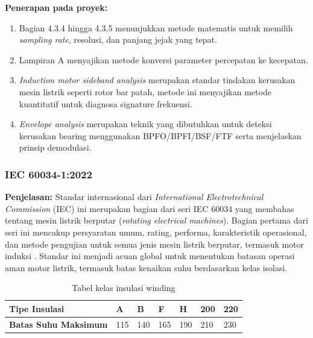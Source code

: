 \documentclass{elsinta}
\begin{document}
\textbf{Penerapan pada proyek:}
\begin{enumerate}
    \item Bagian 4.3.4 hingga 4.3.5 menunjukkan metode matematis untuk memilih \textit{sampling rate}, resolusi, dan panjang jejak yang tepat.
    \item Lampiran A menyajikan metode konversi parameter percepatan ke kecepatan.
    \item \textit{Induction motor sideband analysis} merupakan standar tindakan kerusakan mesin listrik seperti rotor bar patah,  metode ini menyajikan metode kuantitatif untuk diagnosa signature frekuensi.
    \item \textit{Envelope analysis} merupakan teknik yang dibutuhkan untuk deteksi kerusakan bearing menggunakan BPFO/BPFI/BSF/FTF serta menjelaskan prinsip demodulasi.
\end{enumerate}

\subsubsection{IEC 60034-1:2022}

\textbf{Penjelasan:} 
Standar internasional dari \textit{International Electrotechnical Commission} (IEC) ini merupakan bagian dari seri IEC 60034 yang membahas tentang mesin listrik berputar (\textit{rotating electrical machines}). Bagian pertama dari seri ini mencakup persyaratan umum, rating, performa, karakteristik operasional, dan metode pengujian untuk semua jenis mesin listrik berputar, termasuk motor induksi \cite{InternationalElectrotechnicalCommission2022}. Standar ini menjadi acuan global untuk menentukan batasan operasi aman motor listrik, termasuk batas kenaikan suhu berdasarkan kelas isolasi.

    \begin{table}[H]
    \centering
    \caption{Tabel kelas insulasi winding\cite{deSwardt2002}}
    \label{tab:insulation_class}
    \begin{tabular}{|p{3cm}|p{1.5cm}|p{1.5cm}|p{1.5cm}|p{1.5cm}|p{1.5cm}|p{1.5cm}|}
        \hline
        \textbf{Tipe Insulasi} &\textbf{A} & \textbf{B} & \textbf{F} & \textbf{H} & \textbf{200} & \textbf{220}\\
        \hline
        \textbf{Batas Suhu Maksimum} & 115 & 140 & 165 & 190 & 210 & 230 \\
        \hline
    \end{tabular}
    \end{table}
\end{document}
